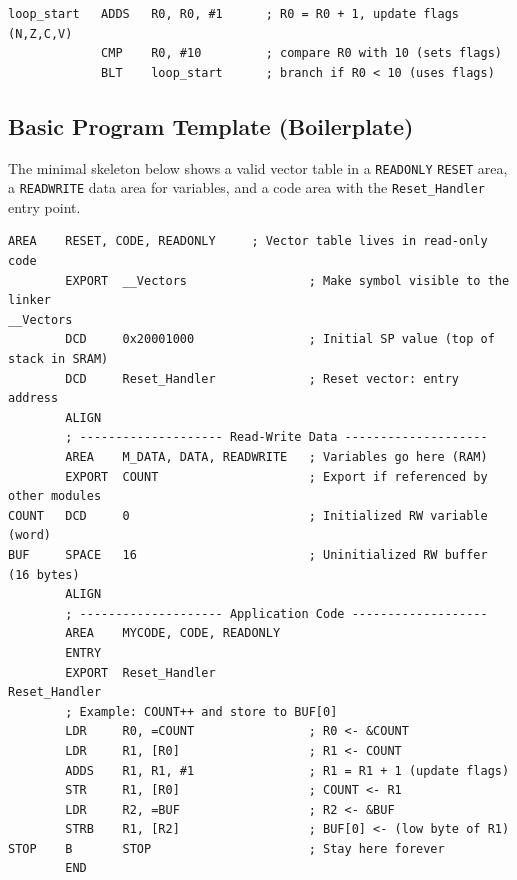 \begin{lstlisting}[caption={Instruction format example}]
loop_start   ADDS   R0, R0, #1      ; R0 = R0 + 1, update flags (N,Z,C,V)
             CMP    R0, #10         ; compare R0 with 10 (sets flags)
             BLT    loop_start      ; branch if R0 < 10 (uses flags)
\end{lstlisting}


\subsection{Basic Program Template (Boilerplate)}

The minimal skeleton below shows a valid vector table in a \texttt{READONLY} \texttt{RESET} area, a \texttt{READWRITE} data area for variables, and a code area with the \texttt{Reset\_Handler} entry point.

\begin{lstlisting}[caption={Cortex-M4 boilerplate with READWRITE data}]
        AREA    RESET, CODE, READONLY     ; Vector table lives in read-only code
        EXPORT  __Vectors                 ; Make symbol visible to the linker
__Vectors
        DCD     0x20001000                ; Initial SP value (top of stack in SRAM)
        DCD     Reset_Handler             ; Reset vector: entry address
        ALIGN        
        ; -------------------- Read-Write Data --------------------
        AREA    M_DATA, DATA, READWRITE   ; Variables go here (RAM)
        EXPORT  COUNT                     ; Export if referenced by other modules
COUNT   DCD     0                         ; Initialized RW variable (word)
BUF     SPACE   16                        ; Uninitialized RW buffer (16 bytes)
        ALIGN        
        ; -------------------- Application Code -------------------
        AREA    MYCODE, CODE, READONLY
        ENTRY
        EXPORT  Reset_Handler
Reset_Handler
        ; Example: COUNT++ and store to BUF[0]
        LDR     R0, =COUNT                ; R0 <- &COUNT
        LDR     R1, [R0]                  ; R1 <- COUNT
        ADDS    R1, R1, #1                ; R1 = R1 + 1 (update flags)
        STR     R1, [R0]                  ; COUNT <- R1        
        LDR     R2, =BUF                  ; R2 <- &BUF
        STRB    R1, [R2]                  ; BUF[0] <- (low byte of R1)
STOP    B       STOP                      ; Stay here forever
        END
\end{lstlisting}


